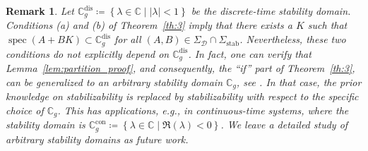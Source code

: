 \documentclass[9pt,shortpaper,twoside,web]{ieeecolor}
\DeclareMathOperator{\spec}{spec}
\newcommand{\set}[2]{\left\{#1 \mid #2\right\}}
\newtheorem{remark}[theorem]{Remark}
\begin{document}
\begin{remark}
Let $\mathbb{C}_{g}^\text{dis}\coloneqq\set{\lambda\in\mathbb{C}}{|\lambda|<1}$ be the discrete-time stability domain. Conditions (a) and (b) of Theorem~\ref{th:3} imply that there exists a $K$ such that $\spec(A+BK)\subset\mathbb{C}_{g}^\text{dis}$ for all \mbox{$(A,B)\in\Sigma_\mathcal{D}\cap\Sigma_\text{stab}$}. Nevertheless, these two conditions do not explicitly depend on $\mathbb{C}_{g}^\text{dis}$. In fact, one can verify that Lemma~\ref{lem:partition_proof}, and consequently, the ``if'' part of Theorem~\ref{th:3}, can be generalized to an arbitrary stability domain $\mathbb{C}_g$, see \cite[Def. 2.12]{trentelmancontrol}. In that case, the prior knowledge on stabilizability is replaced by stabilizability with respect to the specific choice of $\mathbb{C}_g$. This has applications, e.g., in continuous-time systems, where the stability domain is \mbox{$\mathbb{C}_{g}^\text{con}\coloneqq\set{\lambda\in\mathbb{C}}{\mathfrak{R}(\lambda)<0}$}. We leave a detailed study of arbitrary stability domains as future work.
\end{remark}
\end{document}
